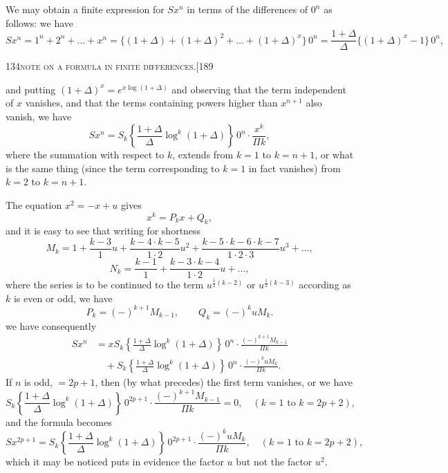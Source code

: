 \documentclass[11pt]{article}
\begin{document}
We may obtain a finite expression for $S x^{n}$ in terms of the differences of $0^{n}$ as
follows: we have
\[
S x^{n} = 1^{n} + 2^{n} + \ldots + x^{n} = \{(1+\Delta) + (1+\Delta)^{2} + \ldots + (1+\Delta)^{x}\}\,0^{n} = \frac{1+\Delta}{\Delta}\{(1+\Delta)^{x} - 1\}\,0^{n},
\]

\begin{center}\small\textsc{134}\hfill\textsc{note on a formula in finite differences.}\hfill[189\end{center}

\noindent and putting $(1+\Delta)^{x} = e^{x\log(1+\Delta)}$ and observing that the term independent of $x$ vanishes,
and that the terms containing powers higher than $x^{n+1}$ also vanish, we have
\[
S x^{n} = S_{k}\left\{\frac{1+\Delta}{\Delta}\log^{k}(1+\Delta)\right\}\, 0^{n} \cdot \frac{x^{k}}{\Pi k},
\]
where the summation with respect to $k$, extends from $k=1$ to $k=n+1$, or what is
the same thing (since the term corresponding to $k=1$ in fact vanishes) from $k=2$ to
$k = n+1$.

The equation $x^{2} = -x + u$ gives
\[
x^{k} = P_{k}x + Q_{k},
\]
and it is easy to see that writing for shortness
\[
M_{k} = 1 + \frac{k-3}{1}u + \frac{k-4\cdot k-5}{1\cdot 2}u^{2} + \frac{k-5\cdot k-6\cdot k-7}{1\cdot 2\cdot 3}u^{3} + \ldots,
\]
\[
N_{k} = \frac{k-1}{1} + \frac{k-3\cdot k-4}{1\cdot 2}u + \ldots,
\]
where the series is to be continued to the term $u^{\frac{1}{2}(k-2)}$ or $u^{\frac{1}{2}(k-3)}$ according as $k$ is
even or odd, we have
\[
P_{k} = (-)^{k+1} M_{k-1},\qquad Q_{k} = (-)^{k} u M_{k}.
\]
we have consequently
\[
\begin{aligned}
S x^{n} &= x S_{k}\left\{\frac{1+\Delta}{\Delta}\log^{k}(1+\Delta)\right\}\,0^{n}\cdot\frac{(-)^{k+1} M_{k-1}}{\Pi k}\\
&\quad + S_{k}\left\{\frac{1+\Delta}{\Delta}\log^{k}(1+\Delta)\right\}\,0^{n}\cdot\frac{(-)^{k} u M_{k}}{\Pi k}.
\end{aligned}
\]
If $n$ is odd, $= 2p+1$, then (by what precedes) the first term vanishes, or we have
\[
S_{k}\left\{\frac{1+\Delta}{\Delta}\log^{k}(1+\Delta)\right\}\,0^{2p+1}\cdot\frac{(-)^{k+1} M_{k-1}}{\Pi k} = 0,\quad (k=1 \text{ to } k = 2p+2),
\]
and the formula becomes
\[
S x^{2p+1} = S_{k}\left\{\frac{1+\Delta}{\Delta}\log^{k}(1+\Delta)\right\}\,0^{2p+1}\cdot\frac{(-)^{k} u M_{k}}{\Pi k},\quad (k=1 \text{ to } k = 2p+2),
\]
which it may be noticed puts in evidence the factor $u$ but not the factor $u^{2}$.
\end{document}
